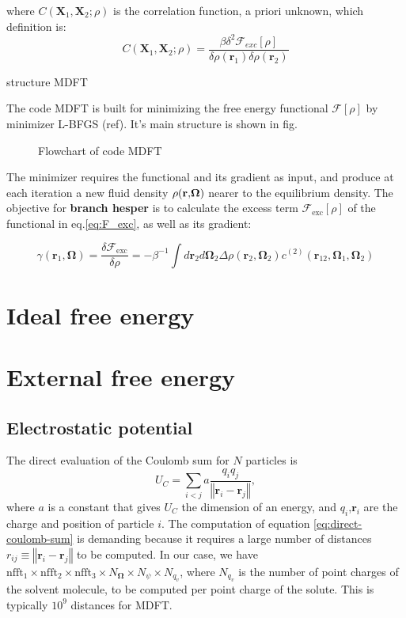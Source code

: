 where $C(\mathbf{X}_{1},\mathbf{X}_{2};\rho)$ is the correlation
function, a priori unknown, which definition is: 
\[
C(\mathbf{X}_{1},\mathbf{X}_{2};\rho)=\frac{\beta\delta^{2}\mathcal{F}_{exc}[\rho]}{\delta\rho(\mathbf{r}_{1})\delta\rho(\mathbf{r}_{2})}
\]


structure MDFT

The code MDFT is built for minimizing the free energy functional $\mathcal{F}[\rho]$
by minimizer L-BFGS (ref). It's main structure is shown in fig. 

\begin{figure}[h]
\caption{%
Flowchart of code MDFT%
}
\end{figure}


The minimizer requires the functional and its gradient as input, and
produce at each iteration a new fluid density $\text{\ensuremath{\rho}(\ensuremath{\mathbf{r}},\ensuremath{\mathbf{\mathbf{\mathbf{\Omega}}}})}$
nearer to the equilibrium density. The objective for \textbf{branch
hesper} is to calculate the excess term $\mathcal{F}_{\mathrm{exc}}[\rho]$
of the functional in eq.\ref{eq:F_exc}, as well as its gradient: 

\begin{equation}
\gamma(\mathbf{r}_{1},\mathbf{\Omega})=\frac{\delta\mathcal{F}_{\mathrm{exc}}}{\delta\rho}=-\beta^{-1}\int d\mathbf{r}_{2}d\mathbf{\Omega}_{2}\Delta\rho(\mathbf{r}_{2},\mathbf{\Omega}_{2})c^{(2)}(\mathbf{r}_{12},\mathbf{\Omega}_{1},\mathbf{\Omega}_{2})\label{eq:gradient}
\end{equation}



\section{Ideal free energy}


\section{External free energy}


\subsection{Electrostatic potential}

The direct evaluation of the Coulomb sum for $N$ particles is 
\begin{equation}
U_{C}=\sum_{i<j}a\frac{q_{i}q_{j}}{\left\Vert \bm{r}_{i}-\bm{r}_{j}\right\Vert },\label{eq:direct-coulomb-sum}
\end{equation}
where $a$ is a constant that gives $U_{C}$ the dimension of an energy,
and $q_{i}$,$\bm{r}_{i}$ are the charge and position of particle
$i$. The computation of equation \ref{eq:direct-coulomb-sum} is
demanding because it requires a large number of distances $r_{ij}\equiv\left\Vert \bm{r}_{i}-\bm{r}_{j}\right\Vert $
to be computed. In our case, we have $\textrm{nfft}_{1}\times\textrm{nfft}_{2}\times\textrm{nfft}_{3}\times N_{\bm{\Omega}}\times N_{\psi}\times N_{q_{v}}$,
where $N_{q_{v}}$ is the number of point charges of the solvent molecule,
to be computed per point charge of the solute. This is typically $10^{9}$
distances for MDFT.

